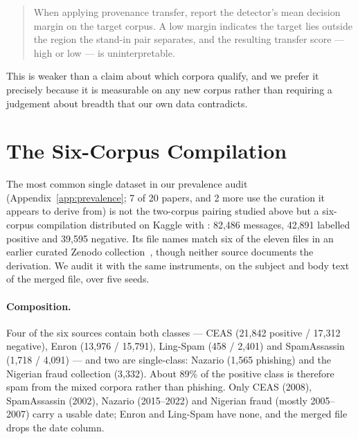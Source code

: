 \documentclass[twoside,11pt]{article}
\begin{document}
\begin{quote}
When applying provenance transfer, report the detector's mean decision margin
on the target corpus. A low margin indicates the target lies outside the
region the stand-in pair separates, and the resulting transfer score --- high
or low --- is uninterpretable.
\end{quote}

This is weaker than a claim about which corpora qualify, and we prefer it
precisely because it is measurable on any new corpus rather than requiring a
judgement about breadth that our own data contradicts.

\section{The Six-Corpus Compilation}
\label{sec:compilation}

The most common single dataset in our prevalence audit
(Appendix~\ref{app:prevalence}; 7 of 20 papers, and 2 more use the curation it
appears to derive from) is not the two-corpus pairing studied above but a six-corpus
compilation distributed on Kaggle with \citet{alsubaiey2024novel}: 82{,}486
messages, 42{,}891 labelled positive and 39{,}595 negative. Its file names
match six of the eleven files in an earlier curated Zenodo
collection~\citep{champa_zenodo}, though neither source documents the
derivation. We audit it with the same instruments, on the subject and body
text of the merged file, over five seeds.

\paragraph{Composition.} Four of the six sources contain both classes ---
CEAS (21{,}842 positive / 17{,}312 negative), Enron (13{,}976 / 15{,}791),
Ling-Spam (458 / 2{,}401) and SpamAssassin (1{,}718 / 4{,}091) --- and two
are single-class: Nazario (1{,}565 phishing) and the Nigerian fraud collection
(3{,}332). About 89\% of the positive class is therefore spam from the mixed
corpora rather than phishing. Only CEAS (2008), SpamAssassin (2002), Nazario
(2015--2022) and Nigerian fraud (mostly 2005--2007) carry a usable date; Enron
and Ling-Spam have none, and the merged file drops the date column.
\end{document}
